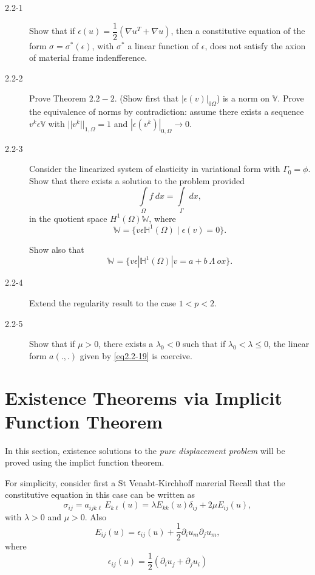 \begin{description}
\item[2.2-1] Show that if $\epsilon(u)=
  \dfrac{1}{2}(\nabla u^T + \nabla u)$, then a
  constitutive equation of the form $\sigma = \sigma^*(\epsilon)$,
  with $\sigma^*$ a linear function of $\epsilon$, does not satisfy
  the axion of material frame indenfference. 

\item[2.2-2] Prove Theorem $2.2-2$. (Show first that $|\epsilon
  (v)|_{0\Omega}$) is a norm on $\mathbb{V}$. Prove the equivalence of
  norms by contradiction: assume there exists a sequence $v^k
  \epsilon\mathbb{V}$ with $|| v^k ||_{1,\Omega}=1 $ and
  $|\epsilon (v^k)|_{0,\Omega} \to 0$. 

\item[2.2-3] Consider the
  linearized system of elasticity in variational form with $\Gamma_0=
  \phi$. Show that there exists a solution to the problem provided 
$$
\int\limits_{\Omega} f ~ dx = \int\limits_{\Gamma} ~ dx,
$$\pageoriginale
in the quotient space $H^1(\Omega)\mathbb{W}$, where 
$$
\mathbb{W} = \{v \epsilon \mathbb{H}^1(\Omega) \mid \epsilon
(v)=0\}. 
$$

Show also that 
$$
\mathbb{W} = \{v \epsilon | \mathbb{H}^1 (\Omega)| v = a+b ~\Lambda~
ox\}.  
$$ 

\item[2.2-4] Extend the regularity result to the case $1 < p < 2$. 

\item[2.2-5] Show that if $\mu > 0$, there exists a $\lambda_0 < 0$
  such that if $\lambda_0 < \lambda \le 0$, the linear form $a(.,.)$
  given by \eqref{eq2.2-19} is coercive. 
\end{description}

\section{Existence Theorems via Implicit Function
  Theorem}\label{chap2-sec2.3}
\setcounter{figure}{0}

In this section, existence solutions to the {\em pure displacement
  problem} will be proved using the implict function theorem. 

For simplicity, consider first a St Venabt-Kirchhoff marerial Recall 
that the constitutive equation in this case can be written as  
\begin{equation*}
  \sigma_{ij} = a_{ijk\ell}\, E_{k\ell} (u) = \lambda E_{kk} (u)
  \delta_{ij} + 2\mu E_{ij}(u), \tag{2.3-1}\label{eq2.3-1} 
\end{equation*}
with $\lambda > 0$ and $\mu > 0$. Also
\begin{equation*}
  E_{ij}(u)=\epsilon_{ij} (u) + \frac{1}{2} \partial_i u_m \partial_j
  u_m,\tag{2.3-2}\label{eq2.3-2} 
\end{equation*}
where
\begin{equation*}
\epsilon_{ij}(u)= \frac{1}{2} (\partial_i u_j + \partial_j u_i)
  \tag{2.3-3}\label{eq2.3-3} 
\end{equation*}

